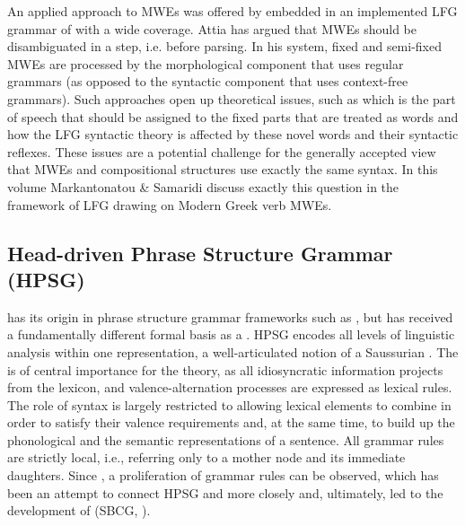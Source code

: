 \documentclass[output=paper]{langsci/langscibook}
\begin{document}
An applied approach to MWEs was offered by \cite{attia2006}   embedded in an implemented LFG grammar of  with a wide coverage. Attia has argued that MWEs should be disambiguated in a  step, i.e. before parsing. In his system, fixed and semi-fixed MWEs are processed by the morphological component that uses regular grammars (as opposed to the syntactic component that uses context-free grammars). Such approaches open up theoretical issues, such as which is the part of speech that should be assigned to the fixed parts that are treated as words and how the LFG syntactic theory is affected by these novel words and their syntactic reflexes.  These issues are a potential challenge for the generally accepted view that MWEs and compositional structures use exactly the same syntax.  In this volume Markantonatou \& Samaridi discuss exactly this question in the framework of LFG drawing on Modern Greek verb MWEs.  



\subsection{Head-driven Phrase Structure Grammar (HPSG)}\label{Sec-HPSG}
 has its origin in phrase structure grammar frameworks such as  \citep{GKPS}, but has received a fundamentally different formal basis as a  \citep{pollard:98,Richter:04}. HPSG encodes all levels of linguistic analysis within one representation, a well-articulated notion of a  Saussurian . The  is of central importance for the theory, as all idiosyncratic information projects from the lexicon, and valence-alternation processes are expressed as lexical rules. The role of syntax is largely restricted to allowing lexical elements to combine in order to satisfy their valence requirements and, at the same time, to build up the phonological and the semantic representations of a sentence. All grammar rules are strictly local, i.e., referring only to a mother node and its immediate daughters. Since \citet{Sag:97}, a proliferation of grammar rules can be observed, which has been an attempt to connect HPSG and  more closely and, ultimately, led to the development of  (SBCG, \citealt{Sag:12}).
 
\end{document}
